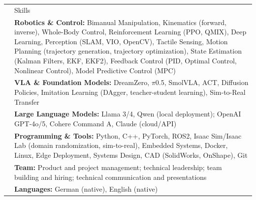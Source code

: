 \documentclass[letterpaper, 11pt]{article}
\newcommand{\headingfont}{\Large\color{CustomBlue}}
\newenvironment{SectionTable}[1]{
	\renewcommand*{\arraystretch}{1.3} %
	\setlength{\tabcolsep}{10pt}
	\begin{longtable}{Rp{4.9in}} & #1 \\}
{\end{longtable}}
\begin{document}
\begin{SectionTable}{\headingfont Skills}

& \textbf{Robotics \& Control:} Bimanual Manipulation, Kinematics (forward, inverse), Whole-Body Control, Reinforcement Learning (PPO, QMIX), Deep Learning, Perception (SLAM, VIO, OpenCV), Tactile Sensing, Motion Planning (trajectory generation, trajectory optimization), State Estimation (Kalman Filters, EKF, EKF2), Feedback Control (PID, Optimal Control, Nonlinear Control), Model Predictive Control (MPC) \\

& \textbf{VLA \& Foundation Models:} DreamZero, \(\pi\)0.5, SmolVLA, ACT, Diffusion Policies, Imitation Learning (DAgger, teacher-student learning), Sim-to-Real Transfer \\

& \textbf{Large Language Models:} Llama 3/4, Qwen (local deployment); OpenAI GPT-4o/5, Cohere Command A, Claude (cloud/API) \\

& \textbf{Programming \& Tools:} Python, C++, PyTorch, ROS2, Isaac Sim/Isaac Lab (domain randomization, sim-to-real), Embedded Systems, Docker, Linux, Edge Deployment, Systems Design, CAD (SolidWorks, OnShape), Git \\

& \textbf{Team:} Product and project management; technical leadership; team building and hiring; technical communication and presentations \\

& \textbf{Languages:} German (native), English (native) \\

\end{SectionTable}

\vspace{-0.5cm}

\end{document}
